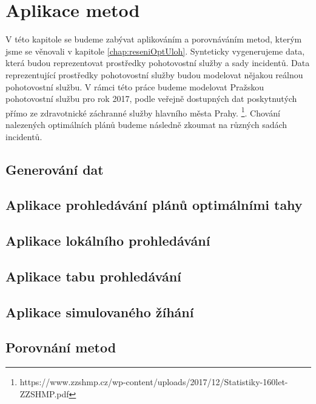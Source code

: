 \chapter{Aplikace metod}

V této kapitole se budeme zabývat aplikováním a porovnáváním metod, kterým jsme se věnovali v kapitole \ref{chap:reseniOptUloh}.
Synteticky vygenerujeme data, která budou reprezentovat prostředky pohotovostní služby a sady incidentů. 
Data reprezentující prostředky pohotovostní služby budou modelovat nějakou reálnou pohotovostní službu.
V rámci této práce budeme modelovat Pražskou pohotovostní službu pro rok 2017, podle veřejně dostupných dat
poskytnutých přímo ze zdravotnické záchranné služby hlavního města Prahy.
\footnote{https://www.zzshmp.cz/wp-content/uploads/2017/12/Statistiky-160let-ZZSHMP.pdf}.
Chování nalezených optimálních plánů budeme následně zkoumat na různých sadách incidentů.

\section{Generování dat}


\section{Aplikace prohledávání plánů optimálními tahy}

\section{Aplikace lokálního prohledávání}

\section{Aplikace tabu prohledávání}

\section{Aplikace simulovaného žíhání}

\section{Porovnání metod}

